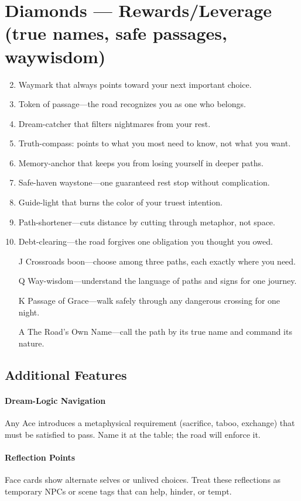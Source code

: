 \section*{Diamonds --- Rewards/Leverage (true names, safe passages, waywisdom)}
\label{sec:ways-between-rewards}
\begin{enumerate}
\setcounter{enumi}{1}
\item Waymark that always points toward your next important choice.
\item Token of passage---the road recognizes you as one who belongs.
\item Dream-catcher that filters nightmares from your rest.
\item Truth-compass: points to what you most need to know, not what you want.
\item Memory-anchor that keeps you from losing yourself in deeper paths.
\item Safe-haven waystone---one guaranteed rest stop without complication.
\item Guide-light that burns the color of your truest intention.
\item Path-shortener---cuts distance by cutting through metaphor, not space.
\item Debt-clearing---the road forgives one obligation you thought you owed.
\item[J] Crossroads boon---choose among three paths, each exactly where you need.
\item[Q] Way-wisdom---understand the language of paths and signs for one journey.
\item[K] Passage of Grace---walk safely through any dangerous crossing for one night.
\item[A] The Road's Own Name---call the path by its true name and command its nature.
\end{enumerate}

\subsection*{Additional Features}
\label{sec:ways-between-features}
\paragraph{Dream-Logic Navigation}
Any Ace introduces a metaphysical requirement (sacrifice, taboo, exchange) that must be satisfied to pass. Name it at the table; the road will enforce it.

\paragraph{Reflection Points}
Face cards show alternate selves or unlived choices. Treat these reflections as temporary NPCs or scene tags that can help, hinder, or tempt.

